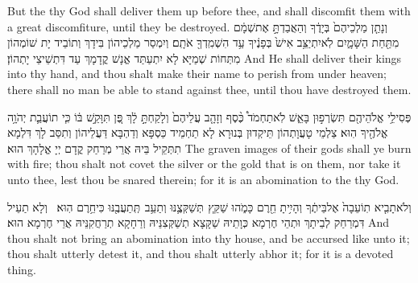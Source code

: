 {But the \lord\space thy God shall deliver them up before thee, and shall discomfit them with a great discomfiture, until they be destroyed.}{}
{וְנָתַ֤ן מַלְכֵיהֶם֙ בְּיָדֶ֔ךָ וְהַאֲבַדְתָּ֣ אֶת\maqqaf שְׁמָ֔ם מִתַּ֖חַת הַשָּׁמָ֑יִם לֹֽא\maqqaf יִתְיַצֵּ֥ב אִישׁ֙ בְּפָנֶ֔יךָ עַ֥ד הִשְׁמִֽדְךָ֖ אֹתָֽם׃}
{וְיִמְסַר מַלְכֵיהוֹן בִּידָךְ וְתוֹבֵיד יָת שׁוֹמְהוֹן מִתְּחוֹת שְׁמַיָּא לָא יִתְעַתַּד אֱנָשׁ קֳדָמָךְ עַד דִּתְשֵׁיצֵי יָתְהוֹן׃}
{And He shall deliver their kings into thy hand, and thou shalt make their name to perish from under heaven; there shall no man be able to stand against thee, until thou have destroyed them.}{}

{פְּסִילֵ֥י אֱלֹהֵיהֶ֖ם תִּשְׂרְפ֣וּן בָּאֵ֑שׁ לֹֽא\maqqaf תַחְמֹד֩ כֶּ֨סֶף וְזָהָ֤ב עֲלֵיהֶם֙ וְלָקַחְתָּ֣ לָ֔ךְ פֶּ֚ן תִּוָּקֵ֣שׁ בּ֔וֹ כִּ֧י תוֹעֲבַ֛ת יְהֹוָ֥ה אֱלֹהֶ֖יךָ הֽוּא׃}
{צַלְמֵי טָעֲוָתְהוֹן תֵּיקְדוּן בְּנוּרָא לָא תַחְמֵיד כַּסְפָּא וְדַהְבָּא דַּעֲלֵיהוֹן וְתִסַּב לָךְ דִּלְמָא תִתְּקֵיל בֵּיהּ אֲרֵי מְרַחַק קֳדָם יְיָ אֱלָהָךְ הוּא׃}
{The graven images of their gods shall ye burn with fire; thou shalt not covet the silver or the gold that is on them, nor take it unto thee, lest thou be snared therein; for it is an abomination to the \lord\space thy God.}{}

{וְלֹא\maqqaf תָבִ֤יא תֽוֹעֵבָה֙ אֶל\maqqaf בֵּיתֶ֔ךָ וְהָיִ֥יתָ חֵ֖רֶם כָּמֹ֑הוּ שַׁקֵּ֧ץ \pasek  תְּשַׁקְּצֶ֛נּוּ וְתַעֵ֥ב \pasek  תְּֽתַעֲבֶ֖נּוּ כִּי\maqqaf חֵ֥רֶם הֽוּא׃ \petucha }
{וְלָא תַעֵיל דִּמְרַחַק לְבֵיתָךְ וּתְהֵי חֶרְמָא כְּוָתֵיהּ שַׁקָּצָא תְשַׁקְּצִנֵּיהּ וְרַחָקָא תְרַחֲקִנֵּיהּ אֲרֵי חֶרְמָא הוּא׃}
{And thou shalt not bring an abomination into thy house, and be accursed like unto it; thou shalt utterly detest it, and thou shalt utterly abhor it; for it is a devoted thing.}{}

